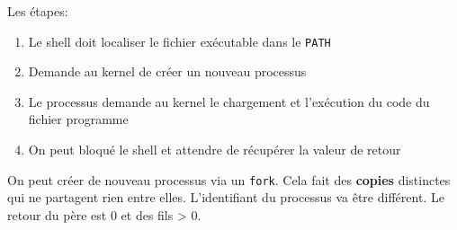 Les étapes:

\begin{enumerate}
\def\labelenumi{\arabic{enumi}.}
\tightlist
\item
  Le shell doit localiser le fichier exécutable dans le \texttt{PATH}
\item
  Demande au kernel de créer un nouveau processus
\item
  Le processus demande au kernel le chargement et l'exécution du code du
  fichier programme
\item
  On peut bloqué le shell et attendre de récupérer la valeur de retour
\end{enumerate}

On peut créer de nouveau processus via un \texttt{fork}. Cela fait des
\textbf{copies} distinctes qui ne partagent rien entre elles.
L'identifiant du processus va être différent. Le retour du père est 0 et
des fils \textgreater{} 0.

